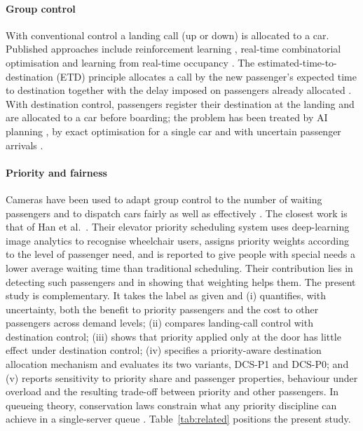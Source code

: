 \documentclass[12pt,a4paper]{article}
\begin{document}
\paragraph{Group control} With conventional control a landing call (up or down) is allocated to a car. Published approaches include reinforcement learning \cite{crites1998,wan2024}, real-time combinatorial optimisation \cite{utgoff2012} and learning from real-time occupancy \cite{wang2021}. The estimated-time-to-destination (ETD) principle allocates a call by the new passenger's expected time to destination together with the delay imposed on passengers already allocated \cite{smith2002}. With destination control, passengers register their destination at the landing and are allocated to a car before boarding; the problem has been treated by AI planning \cite{koehler2002}, by exact optimisation for a single car \cite{tanaka2005} and with uncertain passenger arrivals \cite{sorsa2018}.

\paragraph{Priority and fairness} Cameras have been used to adapt group control to the number of waiting passengers \cite{kimmoon2001} and to dispatch cars fairly as well as effectively \cite{yamauchi2019}. The closest work is that of Han et al.\ \cite{han2024}. Their elevator priority scheduling system uses deep-learning image analytics to recognise wheelchair users, assigns priority weights according to the level of passenger need, and is reported to give people with special needs a lower average waiting time than traditional scheduling. Their contribution lies in detecting such passengers and in showing that weighting helps them. The present study is complementary. It takes the label as given and (i) quantifies, with uncertainty, both the benefit to priority passengers and the cost to other passengers across demand levels; (ii) compares landing-call control with destination control; (iii) shows that priority applied only at the door has little effect under destination control; (iv) specifies a priority-aware destination allocation mechanism and evaluates its two variants, DCS-P1 and DCS-P0; and (v) reports sensitivity to priority share and passenger properties, behaviour under overload and the resulting trade-off between priority and other passengers. In queueing theory, conservation laws constrain what any priority discipline can achieve in a single-server queue \cite{kleinrock1965,schrage1970}. Table~\ref{tab:related} positions the present study.
\end{document}

